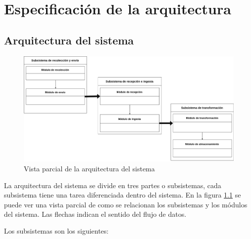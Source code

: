 \chapter{Especificación de la arquitectura}

\section{Arquitectura del sistema}

\begin{figure}[!htb]
	
	\includegraphics[width=\linewidth] {Moduloss-arquitecturaparcial.png}
	\caption{Vista parcial de la arquitectura del sistema}
	\label{fig:arqparcial}
\end{figure}

La arquitectura del sistema se divide en tres partes o subsistemas, cada subsistema tiene una tarea diferenciada dentro del sistema. En la figura \ref{fig:arqparcial} se puede ver una vista parcial de como se relacionan los subsistemas y los módulos del sistema. Las flechas indican el sentido del flujo de datos.
 
 
 Los subsistemas son los siguientes:

